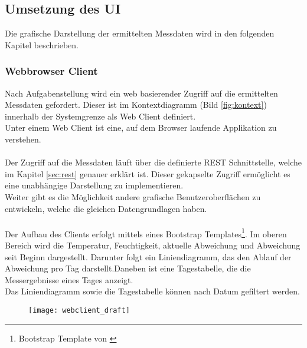 \subsection{Umsetzung des UI} %
Die grafische Darstellung der ermittelten Messdaten wird in den folgenden Kapitel beschrieben.

\subsubsection{Webbrowser Client} 
Nach Aufgabenstellung wird ein web basierender Zugriff auf die ermittelten Messdaten gefordert. Dieser ist im Kontextdiagramm (Bild \ref{fig:kontext}) innerhalb der Systemgrenze als Web Client definiert.\\
Unter einem Web Client ist eine, auf dem Browser laufende Applikation zu verstehen.\\
\\
Der Zugriff auf die Messdaten läuft über die definierte REST Schnittstelle, welche im Kapitel \ref{sec:rest} genauer erklärt ist. Dieser gekapselte Zugriff ermöglicht es eine unabhängige Darstellung zu implementieren.\\
Weiter gibt es die Möglichkeit andere grafische Benutzeroberflächen zu entwickeln, welche die gleichen Datengrundlagen haben.\\
\\
Der Aufbau des Clients erfolgt mittels eines Bootstrap Templates\footnote{Bootstrap Template von \cite{bootstrap}}. Im oberen Bereich wird die Temperatur, Feuchtigkeit, aktuelle Abweichung und Abweichung seit Beginn dargestellt. Darunter folgt ein Liniendiagramm, das den Ablauf der Abweichung pro Tag darstellt.Daneben ist eine Tagestabelle, die die Messergebnisse eines Tages anzeigt.\\
Das Liniendiagramm sowie die Tagestabelle können nach Datum gefiltert werden.

\begin{figure}[H]
    \centering
    \texttt{[image: webclient\_draft]}
\end{figure}